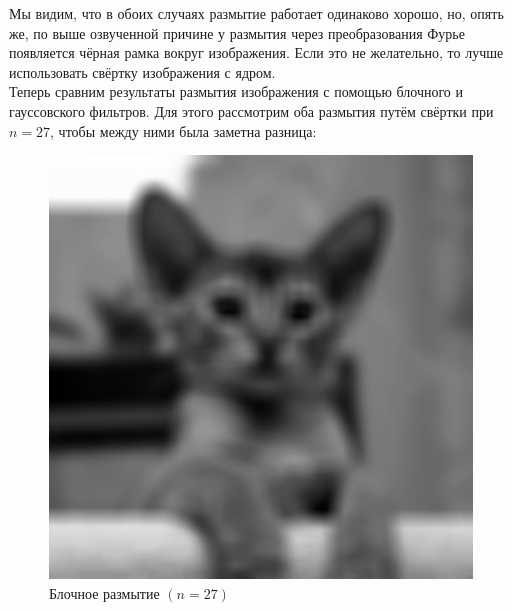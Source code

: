 \documentclass[a4paper]{article}
\begin{document}
Мы видим, что в обоих случаях размытие работает одинаково хорошо, но, опять же, по выше озвученной причине у размытия через преобразования Фурье появляется чёрная рамка вокруг изображения. Если это не желательно, то лучше использовать свёртку изображения с ядром.\\[0.5em]
Теперь сравним результаты размытия изображения с помощью блочного и гауссовского фильтров. Для этого рассмотрим оба размытия путём свёртки при $n = 27$, чтобы между ними была заметна разница:
\begin{figure}[H]
    \hspace{5em}
    \begin{minipage}{0.35\textwidth}
        \includegraphics[width=\textwidth]{sources/2second/block_27.png}
        \caption{Блочное размытие $(n = 27)$}
    \end{minipage}\hfill
    \begin{minipage}{0.35\textwidth}

\end{minipage}
\end{figure}
\end{document}
